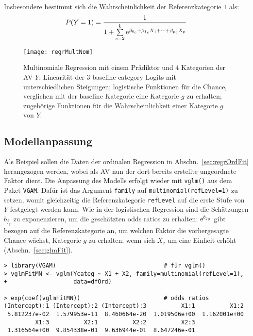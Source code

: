 Insbesondere bestimmt sich die Wahrscheinlichkeit der Referenzkategorie $1$ als:
\begin{equation*}
P(Y = 1) = \frac{1}{1 + \sum\limits_{c=2}^{k} {\mathrm{e}}^{\beta_{0_{c}} + \beta_{1_{c}} X_{1} + \dots + \beta_{p_{c}} X_{p}}}
\end{equation*}

\begin{figure}[ht]
\centering
\texttt{[image: regrMultNom]}
\vspace*{-0.5em}
\caption{Multinomiale Regression mit einem Prädiktor und $4$ Kategorien der AV $Y$: Linearität der 3 baseline category Logits mit unterschiedlichen Steigungen; logistische Funktionen für die Chance, verglichen mit der baseline Kategorie eine Kategorie $g$ zu erhalten; zugehörige Funktionen für die Wahrscheinlichkeit einer Kategorie $g$ von $Y$.}
\label{fig:regrMultNom}
\end{figure}

\subsection{Modellanpassung}

Als Beispiel sollen die Daten der ordinalen Regression in Abschn.\ \ref{sec:regrOrdFit} herangezogen werden, wobei als AV nun der dort bereits erstellte ungeordnete Faktor dient. Die Anpassung des Modells erfolgt wieder mit \lstinline!vglm()! aus dem Paket \lstinline!VGAM!. Dafür ist das Argument \lstinline!family! auf \lstinline!multinomial(refLevel=1)! zu setzen, womit gleichzeitig die Referenzkategorie \lstinline!refLevel! auf die erste Stufe von $Y$ festgelegt werden kann. Wie in der logistischen Regression sind die Schätzungen $b_{j_{g}}$ zu exponenzieren, um die geschätzten odds ratios zu erhalten: ${\mathrm{e}}^{b_{j_{g}}}$ gibt bezogen auf die Referenzkategorie an, um welchen Faktor die vorhergesagte Chance wächst, Kategorie $g$ zu erhalten, wenn sich $X_{j}$ um eine Einheit erhöht (Abschn.\ \ref{sec:glmFit}).
\begin{lstlisting}
> library(VGAM)                               # für vglm()
> vglmFitMN <- vglm(Ycateg ~ X1 + X2, family=multinomial(refLevel=1),
+                   data=dfOrd)

> exp(coef(vglmFitMN))                        # odds ratios
(Intercept):1 (Intercept):2 (Intercept):3          X1:1          X1:2
 5.812237e-02  1.579953e-11  8.460664e-20  1.019506e+00  1.162001e+00
         X1:3          X2:1          X2:2          X2:3
 1.316564e+00  9.854338e-01  9.636944e-01  8.647246e-01
\end{lstlisting}

